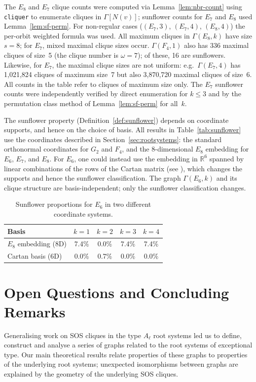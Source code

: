 \documentclass[11pt]{article}
\begin{document}
The $E_8$ and $E_7$ clique counts were computed via Lemma~\ref{lem:nbr-count} using \texttt{cliquer} \cite{cliquer} to enumerate cliques in $\Gamma[N(v)]$; sunflower counts for $E_7$ and $E_8$ used Lemma~\ref{lem:sf-perm}. For non-regular cases ($(E_7,3)$, $(E_7,4)$, $(E_8,4)$) the per-orbit weighted formula was used. All maximum cliques in $\Gamma(E_8, k)$ have size $s = 8$; for $E_7$, mixed maximal clique sizes occur. $\Gamma(F_4, 1)$ also has 336 maximal cliques of size~5 (the clique number is $\omega = 7$); of these, 16 are sunflowers. Likewise, for $E_7$, the maximal clique sizes are not uniform: e.g.\ $\Gamma(E_7,4)$ has 1,021,824 cliques of maximum size~7 but also 3,870,720 maximal cliques of size~6. All counts in the table refer to cliques of maximum size only. The $E_7$ sunflower counts were independently verified by direct enumeration for $k \leq 3$ and by the permutation class method of Lemma~\ref{lem:sf-perm} for all~$k$.

The sunflower property (Definition~\ref{def:sunflower}) depends on coordinate supports, and hence on the choice of basis. All results in Table~\ref{tab:sunflower} use the coordinates described in Section~\ref{sec:rootsystems}: the standard orthonormal coordinates for $G_2$ and $F_4$, and the 8-dimensional $E_8$ embedding for $E_6$, $E_7$, and $E_8$. For $E_6$, one could instead use the embedding in $\mathbb{R}^{6}$ spanned by linear combinations of the rows of the Cartan matrix (see \cite{Humphreys}), which changes the supports and hence the sunflower classification. The graph $\Gamma(E_6, k)$ and its clique structure are basis-independent; only the sunflower classification changes.

\begin{table}[h]
\centering
\begin{tabular}{lcccc}
\toprule
Basis & $k=1$ & $k=2$ & $k=3$ & $k=4$ \\
\midrule
$E_8$ embedding (8D) & 7.4\% & 0.0\% & 7.4\% & 7.4\% \\
Cartan basis (6D) & 0.0\% & 0.7\% & 0.0\% & 0.0\% \\
\bottomrule
\end{tabular}
\caption{Sunflower proportions for $E_6$ in two different coordinate systems. }
\label{tab:basis_dependence}
\end{table}

\section{Open Questions and Concluding Remarks}\label{sec:conclusion}
Generalising work on SOS cliques in the type $A_{\ell}$ root systems led us to define, construct and analyse a series of graphs related to the root systems of exceptional type. Our main theoretical results relate properties of these graphs to properties of the underlying root systems; unexpected isomorphisms between graphs are explained by the geometry of the underlying SOS cliques. 
\end{document}
